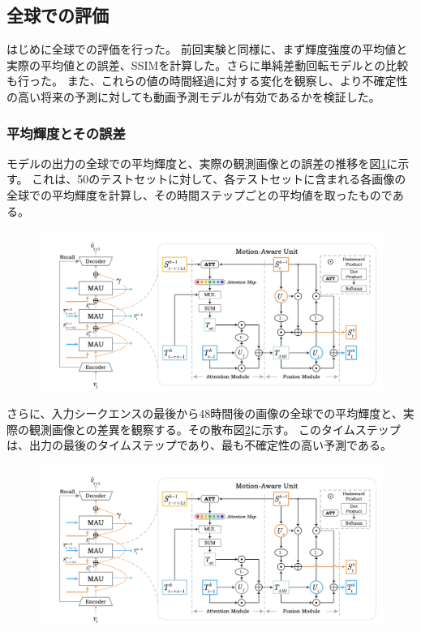     \subsection{全球での評価}
      はじめに全球での評価を行った。
      前回実験と同様に、まず輝度強度の平均値と実際の平均値との誤差、SSIMを計算した。さらに単純差動回転モデルとの比較も行った。
      また、これらの値の時間経過に対する変化を観察し、より不確定性の高い将来の予測に対しても動画予測モデルが有効であるかを検証した。

      \subsubsection{平均輝度とその誤差}
        モデルの出力の全球での平均輝度と、実際の観測画像との誤差の推移を図\ref{fig:exp2_mean_intensity_line}に示す。
        これは、50のテストセットに対して、各テストセットに含まれる各画像の全球での平均輝度を計算し、その時間ステップごとの平均値を取ったものである。

        \begin{figure}[h]
          \centering
          \includegraphics[width=\textwidth]{figures/mau.png}
          \caption{}
          \label{fig:exp2_mean_intensity_line}
        \end{figure}
        
        さらに、入力シークエンスの最後から48時間後の画像の全球での平均輝度と、実際の観測画像との差異を観察する。その散布図\ref{fig:exp2_mean_intensity_scatter}に示す。
        このタイムステップは、出力の最後のタイムステップであり、最も不確定性の高い予測である。

        \begin{figure}[h]
          \centering
          \includegraphics[width=\textwidth]{figures/mau.png}
          \caption{}
          \label{fig:exp2_mean_intensity_scatter}
        \end{figure}

